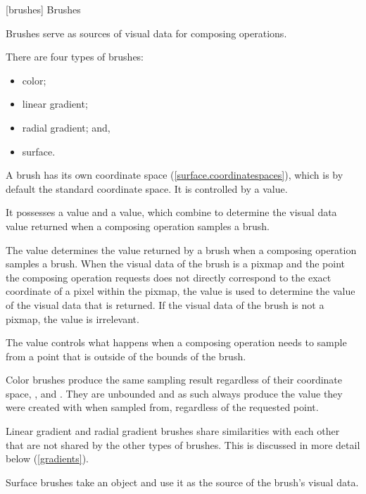 
 [brushes] {Brushes}

\pnum
Brushes serve as sources of visual data for composing operations.

There are four types of brushes:
\begin{itemize}
	\item color;
	\item linear gradient;
	\item radial gradient; and,
	\item surface.
\end{itemize}

\pnum
A brush has its own coordinate space (\ref{surface.coordinatespaces}), which is by default the standard coordinate space. It is controlled by a  value.

\pnum
It possesses a  value and a  value, which combine to determine the visual data value returned when a composing operation samples a brush.

\pnum
The  value determines the value returned by a brush when a composing operation samples a brush. When the visual data of the brush is a pixmap and the point the composing operation requests does not directly correspond to the exact coordinate of a pixel within the pixmap, the  value is used to determine the value of the visual data that is returned. If the visual data of the brush is not a pixmap, the  value is irrelevant.

\pnum
The  value controls what happens when a composing operation needs to sample from a point that is outside of the bounds of the brush.

%

\pnum
Color brushes produce the same sampling result regardless of their coordinate space, , and . They are unbounded and as such always produce the  value they were created with when sampled from, regardless of the requested point.

\pnum
Linear gradient and radial gradient brushes share similarities with each other that are not shared by the other types of brushes. This is discussed in more detail below (\ref{gradients}).

\pnum
Surface brushes take an  object and use it as the source of the brush's visual data.

\addtocounter{SectionDepthBase}{1}






%
%
%
%
\addtocounter{SectionDepthBase}{-1}
